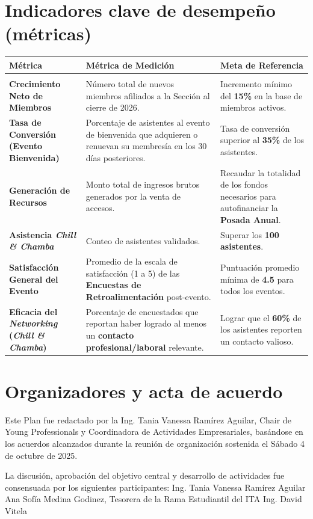 \documentclass[11pt,a4paper]{article}
\begin{document}
\section{Indicadores clave de desempeño (métricas)}

\small
\renewcommand{\arraystretch}{1.5}
\begin{tabularx}{\textwidth}{@{}p{3cm} X X@{}}
    Métrica & Métrica de Medición & Meta de Referencia \\[0.4cm]
    \hline
    \\[-0.3cm]
    
    \textbf{Crecimiento Neto de Miembros} & 
    Número total de nuevos miembros afiliados a la Sección al cierre de 2026. & 
    Incremento mínimo del \textbf{15\%} en la base de miembros activos. \\[0.8cm]
    
    \textbf{Tasa de Conversión (Evento Bienvenida)} & 
    Porcentaje de asistentes al evento de bienvenida que adquieren o renuevan su membresía en los 30 días posteriores. & 
    Tasa de conversión superior al \textbf{35\%} de los asistentes. \\[0.8cm]
    
    \textbf{Generación de Recursos} & 
    Monto total de ingresos brutos generados por la venta de accesos. & 
    Recaudar la totalidad de los fondos necesarios para autofinanciar la \textbf{Posada Anual}. \\[0.8cm]
    
    \textbf{Asistencia \textit{Chill \& Chamba}} & 
    Conteo de asistentes validados. & 
    Superar los \textbf{100 asistentes}. \\[0.8cm]
    
    \textbf{Satisfacción General del Evento} & 
    Promedio de la escala de satisfacción (1 a 5) de las \textbf{Encuestas de Retroalimentación} post-evento. & 
    Puntuación promedio mínima de \textbf{4.5} para todos los eventos. \\[0.8cm]
    
    \textbf{Eficacia del \textit{Networking} (\textit{Chill \& Chamba})} & 
    Porcentaje de encuestados que reportan haber logrado al menos un \textbf{contacto profesional/laboral} relevante. & 
    Lograr que el \textbf{60\%} de los asistentes reporten un contacto valioso. \\[0.5cm]
\end{tabularx}
\renewcommand{\arraystretch}{1.0}
\normalsize


\section{Organizadores y acta de acuerdo}
Este Plan fue redactado por la Ing. Tania Vanessa Ramírez Aguilar, Chair de Young Professionals y Coordinadora de Actividades Empresariales, basándose en los acuerdos alcanzados durante la reunión de organización sostenida el Sábado 4 de octubre de 2025.

La discusión, aprobación del objetivo central y desarrollo de actividades fue consensuada por los siguientes participantes:
Ing. Tania Vanessa Ramírez Aguilar
Ana Sofía Medina Godinez, Tesorera de la Rama Estudiantil del ITA
Ing. David Vitela
\end{document}

